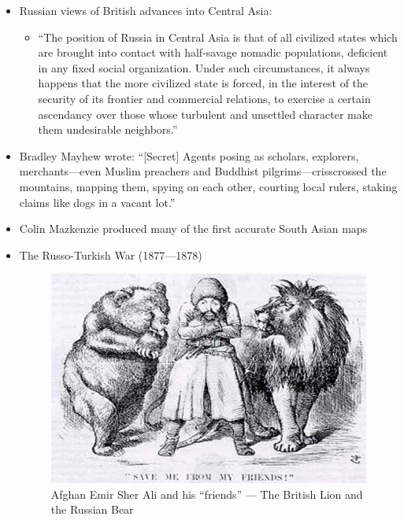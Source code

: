 \begin{itemize}
\begin{itemize}
    \end{itemize}

  \item Russian views of British advances into Central Asia:

    \begin{itemize}

      \item ``The position of Russia in Central Asia is that of all civilized states which are brought into contact with half-savage nomadic populations, deficient in any fixed social organization. Under such circumstances, it always happens that the more civilized state is forced, in the interest of the security of its frontier and commercial relations, to exercise a certain ascendancy over those whose turbulent and unsettled character make them undesirable neighbors.''

    \end{itemize}

  \item Bradley Mayhew wrote: “[Secret] Agents posing as scholars, explorers, merchants—even Muslim preachers and Buddhist pilgrims—crisscrossed the mountains, mapping them, spying on each other, courting local rulers, staking claims like dogs in a vacant lot.”

  \item Colin Mazkenzie produced many of the first accurate South Asian maps 

  \item The Russo-Turkish War (1877—1878)

    \begin{figure}[h!]
      \centering \includegraphics{images/AfghanEmir.jpg}
      \caption{Afghan Emir Sher Ali and his ``friends'' — The British Lion and the Russian Bear}
    \end{figure}


\end{itemize}
